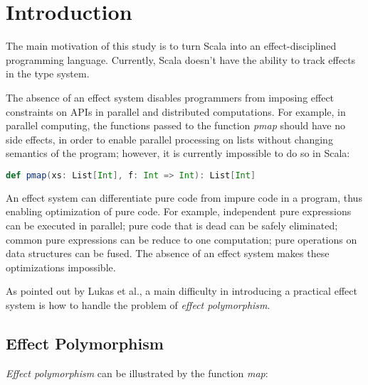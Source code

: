 \section{Introduction}




The main motivation of this study is to turn Scala into an
effect-disciplined programming language. Currently, Scala doesn't have
the ability to track effects in the type system.

The absence of an effect system disables programmers from imposing
effect constraints on APIs in parallel and distributed
computations. For example, in parallel computing, the functions passed
to the function \emph{pmap} should have no side effects, in order to
enable parallel processing on lists without changing semantics of the
program; however, it is currently impossible to do so in Scala:

\begin{lstlisting}[language=Scala]
def pmap(xs: List[Int], f: Int => Int): List[Int]
\end{lstlisting}

An effect system can differentiate pure code from impure code in a
program, thus enabling optimization of pure code. For example,
independent pure expressions can be executed in parallel; pure code
that is dead can be safely eliminated; common pure expressions can be
reduce to one computation; pure operations on data structures can be
fused\cite{coutts2007stream}. The absence of an effect system makes
these optimizations impossible.

As pointed out by Lukas et al.\cite{rytz2012lightweight}, a main
difficulty in introducing a practical effect system is how to handle
the problem of \emph{effect polymorphism}.

\subsection{Effect Polymorphism}

\emph{Effect polymorphism} can be illustrated by the
function \emph{map}:

